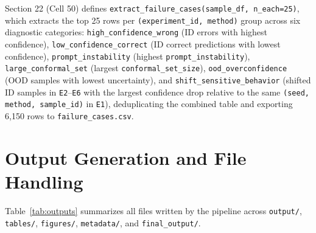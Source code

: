 \documentclass[11pt,a4paper]{article}
\begin{document}
Section 22 (Cell 50) defines \texttt{extract\_\allowbreak{}failure\_\allowbreak{}cases(\allowbreak{}sample\_\allowbreak{}df,\allowbreak{} n\_\allowbreak{}each=25)}, which extracts the top 25 rows per \texttt{(\allowbreak{}experiment\_\allowbreak{}id,\allowbreak{} method)} group across six diagnostic categories: \texttt{high\_\allowbreak{}confidence\_\allowbreak{}wrong} (ID errors with highest confidence), \texttt{low\_\allowbreak{}confidence\_\allowbreak{}correct} (ID correct predictions with lowest confidence), \texttt{prompt\_\allowbreak{}instability} (highest \texttt{prompt\_\allowbreak{}instability}), \texttt{large\_\allowbreak{}conformal\_\allowbreak{}set} (largest \texttt{conformal\_\allowbreak{}set\_\allowbreak{}size}), \texttt{ood\_\allowbreak{}overconfidence} (OOD samples with lowest uncertainty), and \texttt{shift\_\allowbreak{}sensitive\_\allowbreak{}behavior} (shifted ID samples in \texttt{E2}--\texttt{E6} with the largest confidence drop relative to the same \texttt{(\allowbreak{}seed,\allowbreak{} method,\allowbreak{} sample\_\allowbreak{}id)} in \texttt{E1}), deduplicating the combined table and exporting 6,150 rows to \texttt{failure\_\allowbreak{}cases.\allowbreak{}csv}.

\section{Output Generation and File Handling}

Table~\ref{tab:outputs} summarizes all files written by the pipeline across \texttt{output/\allowbreak{}}, \texttt{tables/\allowbreak{}}, \texttt{figures/\allowbreak{}}, \texttt{metadata/\allowbreak{}}, and \texttt{final\_\allowbreak{}output/\allowbreak{}}.
\end{document}
